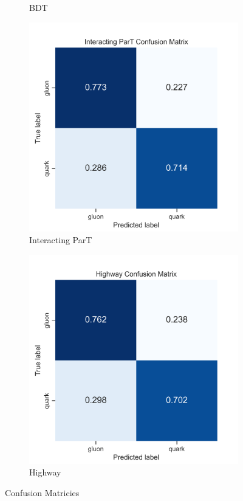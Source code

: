 \begin{figure}[!htb]
\begin{subfigure}[t]{0.38\textwidth}
		\caption{BDT}
		\label{fig:app_cm_bdt}
	\end{subfigure}
	\begin{subfigure}[t]{0.38\textwidth}
		\includegraphics[width=1\textwidth]{src/plots/results/cm/interacting_part.png}
		\caption{Interacting ParT}
		\label{fig:app_cm_interacting_part}
	\end{subfigure}
	\begin{subfigure}[t]{0.38\textwidth}
		\includegraphics[width=1\textwidth]{src/plots/results/cm/highway.png}
		\caption{Highway}
		\label{fig:app_cm_highway}
	\end{subfigure}
\caption{Confusion Matricies}
\label{fig:app_cm_-1-3}
\end{figure}

